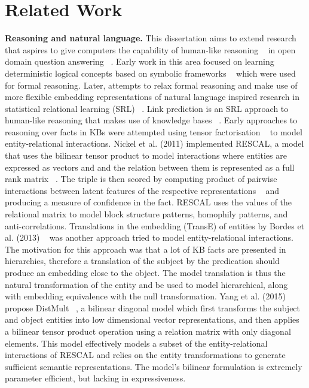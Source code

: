 \section{Related Work} %
\textbf{Reasoning and natural language.} This dissertation aims to extend research that aspires to give computers the capability of human-like reasoning ~\citep{bordes2011learning} in open domain question answering ~\citep{hakimov2019evaluating}. Early work in this area focused on learning deterministic logical concepts based on symbolic frameworks ~\citep{hohenecker2017deep} which were used for formal reasoning. Later, attempts to relax formal reasoning and make use of more flexible embedding representations of natural language inspired research in statistical relational learning (SRL) ~\citep{koller2007introduction}. Link prediction is an SRL approach to human-like reasoning that makes use of knowledge bases ~\citep{balazevic2019hypernetwork, dettmers2018convolutional, socher2013reasoning}. \newline
Early approaches to reasoning over facts in KBs were attempted using tensor factorisation ~\citep{nickel2011three} to model entity-relational interactions. Nickel et al. (2011) implemented RESCAL, a model that uses the bilinear tensor product to model interactions where entities are expressed as vectors and and the relation between them is represented as a full rank matrix ~\citep{nickel2012factorizing}. The triple is then scored by computing product of pairwise interactions between latent features of the respective representations ~\citep{nickel2015review} and producing a measure of confidence in the fact. RESCAL uses the values of the relational matrix to model block structure patterns, homophily patterns, and anti-correlations. \newline
Translations in the embedding (TransE) of entities by Bordes et al. (2013) ~\citep{bordes2013translating} was another approach tried to model entity-relational interactions. The motivation for this approach was that a lot of KB facts are presented in hierarchies, therefore a translation of the subject by the predication should produce an embedding close to the object. The model translation is thus the natural transformation of the entity and be used to model hierarchical, along with embedding equivalence with the null transformation. \newline
Yang et al. (2015) propose DistMult ~\citep{yang2014embedding}, a bilinear diagonal model which first transforms the subject and object entities into low dimensional vector representations, and then applies a bilinear tensor product operation using a relation matrix with only diagonal elements. This model effectively models a subset of the entity-relational interactions of RESCAL and relies on the entity transformations to generate sufficient semantic representations. The model's bilinear formulation is extremely parameter efficient, but lacking in expressiveness. \newline
